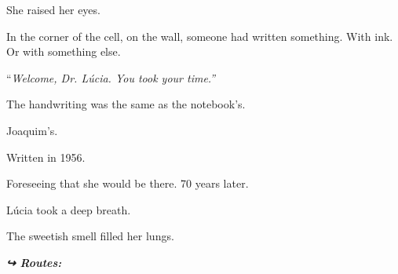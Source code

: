 \noindent She raised her eyes.

\noindent In the corner of the cell, on the wall, someone had written something. With ink. Or with something else.

\noindent \textquotedblleft{\textit{Welcome, Dr. Lúcia. You took your time.\textquotedblright{}}}

\noindent The handwriting was the same as the notebook's.

\noindent Joaquim's.

\noindent Written in 1956.

\noindent Foreseeing that she would be there. 70 years later.

\noindent Lúcia took a deep breath.

\noindent The sweetish smell filled her lungs.

\vspace{0.5em}
\noindent\textit{\textbf{↪ Routes:}  \rotasep {}}
